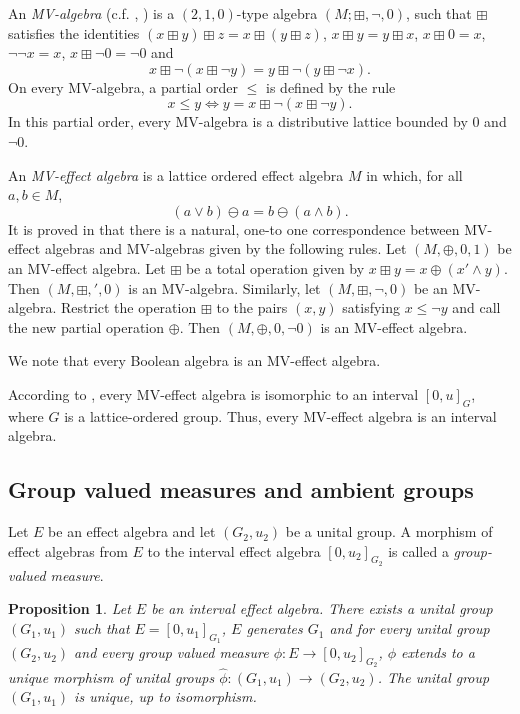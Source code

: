 \documentclass[letterpaper]{amsart}
\newtheorem{proposition}{Proposition}
\theoremstyle{definition}
\begin{document}
An {\em MV-algebra} (c.f. \cite{Cha:AAoMVL}, \cite{Mun:IoAFCSAiLSC}) is a
$(2,1,0)$-type algebra $(M;\boxplus,\lnot,0)$, 
such that $\boxplus$
satisfies the
identities $(x\boxplus y)\boxplus z=x\boxplus (y\boxplus z)$,
$x\boxplus y=y\boxplus x$, $x\boxplus0=x$, $\lnot\lnot x=x$, $x\boxplus\lnot 0=\lnot 0$ and
$$
x\boxplus\lnot(x\boxplus\lnot y)=y\boxplus\lnot(y\boxplus\lnot x)\text{.}
$$
On every MV-algebra, a partial order $\leq$ is defined
by the rule
$$
x\leq y\Longleftrightarrow y=x\boxplus\lnot(x\boxplus\lnot y).
$$
In this partial order, every MV-algebra is a distributive lattice bounded by
$0$ and $\lnot 0$.

An {\em MV-effect algebra} is a lattice ordered effect algebra $M$ in which,
for all $a,b\in M$, 
\begin{equation}\label{eq:MV}
(a\lor b)\ominus a=b\ominus (a\land b).
\end{equation}
 It is proved
in \cite{ChoKop:BDP} that there is a natural, one-to one correspondence between
MV-effect algebras and MV-algebras given by the following rules.
Let $(M,\oplus,0,1)$ be an MV-effect algebra. Let $\boxplus$ 
be a total operation given by $x \boxplus y=x\oplus(x'\land y)$. Then
$(M,\boxplus,',0)$ is an MV-algebra. Similarly, let 
$(M,\boxplus,\lnot,0)$ be an MV-algebra. Restrict the operation
$\boxplus$ to the pairs $(x,y)$ satisfying $x\leq\lnot y$ and call the
new partial operation $\oplus$. Then $(M,\oplus,0,\lnot 0)$ is an MV-effect algebra.

We note that every Boolean algebra is an MV-effect algebra. 

According to \cite{Mun:IoAFCSAiLSC}, every MV-effect algebra is isomorphic to an interval $[0,u]_G$, where $G$ is a lattice-ordered group. Thus, every MV-effect algebra is an interval algebra.

\subsection{Group valued measures and ambient groups}

Let $E$ be an effect algebra and let $(G_2,u_2)$ be a unital group. A morphism
of effect algebras from $E$ to the interval effect algebra $[0,u_2]_{G_2}$ 
is called a {\em group-valued measure}.

\begin{proposition}\label{prop:ambient}
\cite{BenFou:IaSEA}
Let $E$ be an interval effect algebra. There exists a unital group
$(G_1,u_1)$ such that $E=[0,u_1]_{G_1}$,
$E$ generates $G_1$ and for every unital group $(G_2,u_2)$ and
every group valued measure $\phi:E\to [0,u_2]_{G_2}$, $\phi$ 
extends to a unique morphism of unital groups $\widehat\phi:(G_1,u_1)\to (G_2,u_2)$.
The unital group $(G_1,u_1)$ is unique, up to isomorphism.
\end{proposition}
\end{document}
